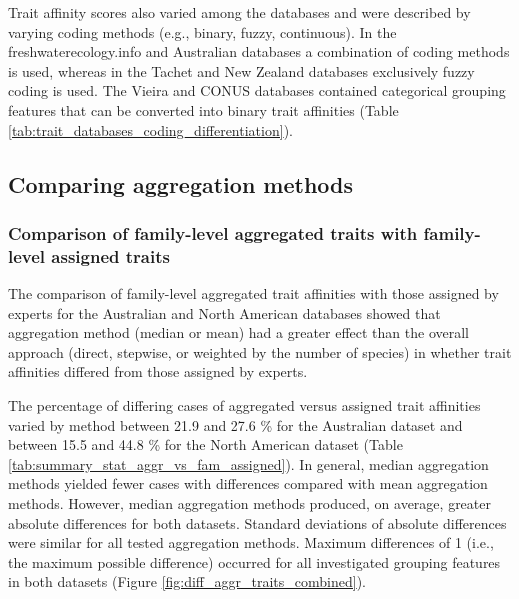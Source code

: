\documentclass[12pt]{article}
\begin{document}
Trait affinity scores also varied among the databases and were described by varying coding methods (e.g., binary, fuzzy, continuous). In the freshwaterecology.info and Australian databases a combination of coding methods is used, whereas in the Tachet and New Zealand databases exclusively fuzzy coding is used. The Vieira and CONUS databases contained categorical grouping features that can be converted into binary trait affinities (Table \ref{tab:trait_databases_coding_differentiation}).


\subsection*{Comparing aggregation methods} 

\subsubsection*{Comparison of family-level aggregated traits with family-level assigned traits}
\label{sec:diff_trait_agg_chessman}

The comparison of family-level aggregated trait affinities with those assigned by experts for the Australian and North American databases showed that aggregation method (median or mean) had a greater effect than the overall approach (direct, stepwise, or weighted by the number of species) in whether trait affinities differed from those assigned by experts.

The percentage of differing cases of aggregated versus assigned trait affinities varied by method between 21.9 and 27.6 \% for the Australian dataset and between 15.5 and 44.8 \% for the North American dataset (Table \ref{tab:summary_stat_aggr_vs_fam_assigned}). In general, median aggregation methods yielded fewer cases with differences compared with mean aggregation methods. However, median aggregation methods produced, on average, greater absolute differences for both datasets. Standard deviations of absolute differences were similar for all tested aggregation methods. Maximum differences of 1 (i.e., the maximum possible difference) occurred for all investigated grouping features in both datasets (Figure \ref{fig:diff_aggr_traits_combined}).
\end{document}
